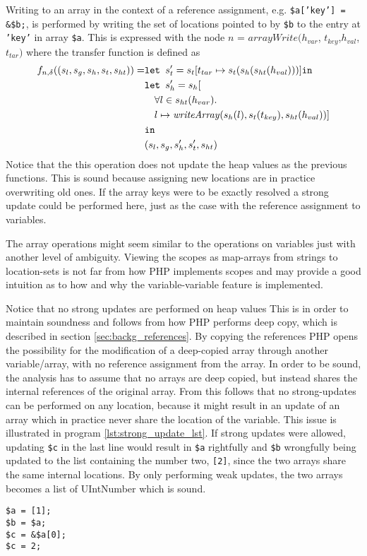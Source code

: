Writing to an array in the context of a reference assignment, e.g. \texttt{\$a['key'] = \&\$b;}, is performed by writing the set of locations pointed to by \texttt{\$b} to the entry at \texttt{'key'} in array \texttt{\$a}.  This is expressed with the node $n$ = $\mathit{arrayWrite}(h_{var}$, $t_{key}$,$h_{val}$,$t_{tar})$ where the transfer function is defined as 
\begin{align}
    f_{n,\delta}((s_l, s_g, s_h, s_t, s_{ht})) = &\texttt{let } s_t' = s_t[t_{tar}\mapsto s_t(s_h(s_{ht}(h_{val})))] \texttt{in }\notag\\
                              &\texttt{let } s_h' = s_h[\notag\\
                              &\quad \forall l \in s_{ht}(h_{var}).\notag\\
                              &\quad l\mapsto \mathit{writeArray}(s_h(l), s_t(t_{key}), s_{ht}(h_{val}))]\notag\\
                              & \texttt{in }\notag\\
                              &(s_l, s_g, s_h', s_t', s_{ht})
\end{align}
Notice that the this operation does not update the heap values as the previous functions. This is sound because assigning new locations are in practice overwriting old ones. If the array keys were to be exactly resolved a strong update could be performed here, just as the case with the reference assignment to variables.


The array operations might seem similar to the operations on variables just with another level of ambiguity. Viewing the scopes as map-arrays from strings to location-sets is not far from how PHP implements scopes and may provide a good intuition as to how and why the variable-variable feature is implemented. 

Notice that no strong updates are performed on heap values This is in order to maintain soundness and follows from how PHP performs deep copy, which is described in section \ref{sec:backg_references}. By copying the references PHP opens the possibility for the modification of a deep-copied array through another variable/array, with no reference assignment from the array.  In order to be sound, the analysis has to assume that no arrays are deep copied, but instead shares the internal references of the original array. From this follows that no strong-updates can be performed on any location, because it might result in an update of an array which in practice never share the location of the variable. This issue is illustrated in program \ref{lst:strong_update_lst}. If strong updates were allowed, updating \texttt{\$c} in the last line would result in \texttt{\$a} rightfully and \texttt{\$b} wrongfully being updated to the list containing the number two, \texttt{[2]}, since the two arrays share the same internal locations. By only performing weak updates, the two arrays becomes a list of { UIntNumber} which is sound.
\begin{program}
\centering
\begin{lstlisting}
$a = [1];
$b = $a;
$c = &$a[0];
$c = 2;
\end{lstlisting}
\caption{  }
\label{lst:strong_update_lst}
\end{program}
